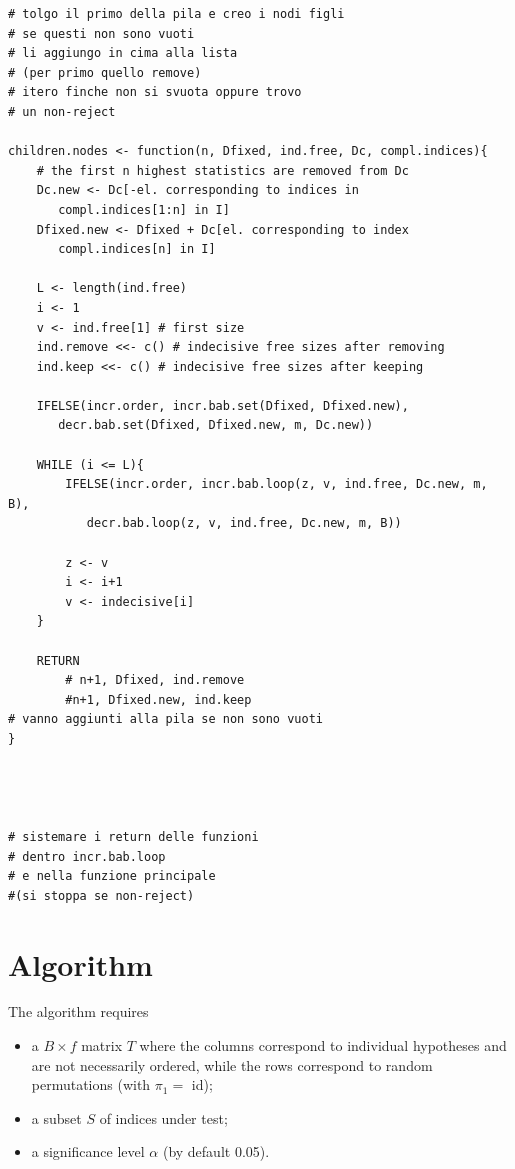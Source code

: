 \documentclass[11pt,a4paper,openright,twoside]{article}
\begin{document}
\begin{lstlisting}
# tolgo il primo della pila e creo i nodi figli
# se questi non sono vuoti
# li aggiungo in cima alla lista
# (per primo quello remove)
# itero finche non si svuota oppure trovo
# un non-reject

children.nodes <- function(n, Dfixed, ind.free, Dc, compl.indices){
	# the first n highest statistics are removed from Dc
	Dc.new <- Dc[-el. corresponding to indices in
	   compl.indices[1:n] in I]
	Dfixed.new <- Dfixed + Dc[el. corresponding to index
	   compl.indices[n] in I]

	L <- length(ind.free)
	i <- 1
	v <- ind.free[1] # first size	
	ind.remove <<- c() # indecisive free sizes after removing
	ind.keep <<- c() # indecisive free sizes after keeping

	IFELSE(incr.order, incr.bab.set(Dfixed, Dfixed.new),
	   decr.bab.set(Dfixed, Dfixed.new, m, Dc.new))

	WHILE (i <= L){
		IFELSE(incr.order, incr.bab.loop(z, v, ind.free, Dc.new, m, B),
		   decr.bab.loop(z, v, ind.free, Dc.new, m, B))

		z <- v
		i <- i+1
		v <- indecisive[i]
	}

	RETURN
		# n+1, Dfixed, ind.remove
		#n+1, Dfixed.new, ind.keep
# vanno aggiunti alla pila se non sono vuoti
}




# sistemare i return delle funzioni
# dentro incr.bab.loop
# e nella funzione principale
#(si stoppa se non-reject)
\end{lstlisting}
















\newpage
\section{Algorithm}
The algorithm requires
\begin{itemize}
\item a $B\times f$ matrix $T$ where the columns correspond to individual hypotheses and are not necessarily ordered, while the rows correspond to random permutations (with $\pi_1=$ id);
\item a subset $S$ of indices under test;
\item a significance level $\alpha$ (by default 0.05).
\end{itemize}
\end{document}
